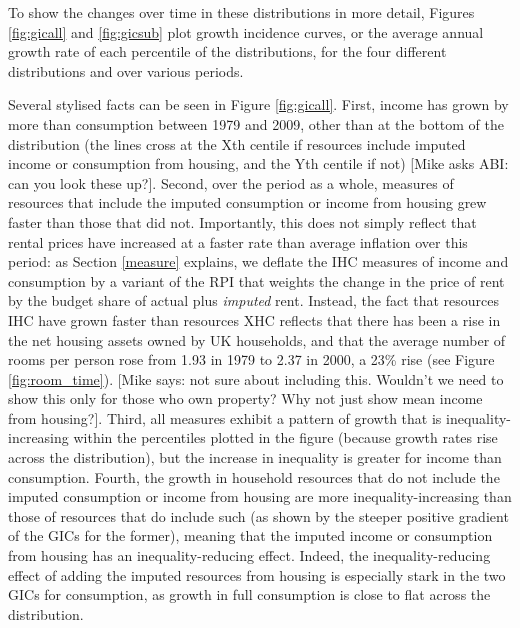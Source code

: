 
To show the changes over time in these distributions in more detail, Figures \ref{fig:gicall} and \ref{fig:gicsub} plot growth incidence curves, or the average annual growth rate of each percentile of the distributions, for the four different distributions and over various periods.

Several stylised facts can be seen in Figure \ref{fig:gicall}. First, income has grown by more than consumption between 1979 and 2009, other than at the bottom of the distribution (the lines cross at the Xth centile if resources include imputed income or consumption from housing, and the Yth centile if not) [Mike asks ABI: can you look these up?]. Second, over the period as a whole, measures of resources that include the imputed consumption or income from housing grew faster than those that did not. Importantly, this does not simply reflect that rental prices have increased at a faster rate than average inflation over this period: as Section \ref{measure} explains, we deflate the IHC measures of income and consumption by a variant of the RPI that weights the change in the price of rent by the budget share of actual plus \emph{imputed} rent. Instead, the fact that resources IHC have grown faster than resources XHC reflects that there has been a rise in the net housing assets owned by UK households, and that the average number of rooms per person rose from 1.93 in 1979 to 2.37 in 2000, a 23\% rise (see Figure  \ref{fig:room_time}). [Mike says: not sure about including this. Wouldn't we need to show this only for those who own property? Why not just show mean income from housing?]. Third, all measures exhibit a pattern of growth that is inequality-increasing within the percentiles plotted in the figure (because growth rates rise across the distribution), but the increase in inequality is greater for income than consumption. Fourth, the growth in household resources that do not include the imputed consumption or income from housing are more inequality-increasing than those of resources that do include such (as shown by the steeper positive gradient of the GICs for the former), meaning that the imputed income or consumption from housing has an inequality-reducing effect. Indeed, the inequality-reducing effect of adding the imputed resources from housing is especially stark in the two GICs for consumption, as growth in full consumption is close to flat across the distribution.

